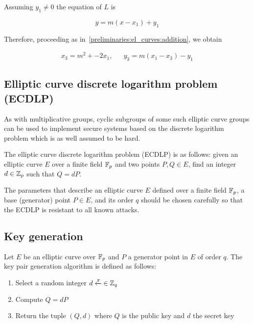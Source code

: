 Assuming $y_1 \neq 0$ the equation of $L$ is

\begin{equation*}
  y = m(x - x_1) + y_1
\end{equation*}

Therefore, proceeding as in~\ref{preliminaries:el_curves:addition}, we obtain

\begin{align*}
  x_3 = m^{2} + - 2x_1, && y_3 = m(x_1 - x_3) - y_1
\end{align*}

\subsection{Elliptic curve discrete logarithm problem (ECDLP)}

As with multiplicative groups, cyclic subgroups of some such elliptic curve groups can be used to implement secure systems based on the discrete logarithm problem which is as well assumed to be hard.

\begin{dfn}
  The elliptic curve discrete logarithm problem (ECDLP) is as follows: given an elliptic curve $E$ over a finite field $\mathbb{F}_p$ and two points $P, Q \in E$, find an integer $d \in \mathbb{Z}_p$ such that $Q = dP$.
\end{dfn}

The parameters that describe an elliptic curve $E$ defined over a finite field $\mathbb{F}_p$, a base (generator) point $P \in E$, and its order $q$ should be chosen carefully so that the ECDLP is resistant to all known attacks.

\subsection[Key generation]{Key generation~\cite{elliptic_curves_2}}
\label{preliminaries:el_curves:key_gen}

Let $E$ be an elliptic curve over $\mathbb{F}_p$ and $P$ a generator point in $E$ of order $q$. The key pair generation algorithm is defined as follows:

\begin{enumerate}
  \item Select a random integer $d \xleftarrow{\mathtt{r}}{\in \mathbb{Z}_q}$
  \item Compute $Q = dP$
  \item Return the tuple $(Q, d)$ where $Q$ is the public key and $d$ the secret key
\end{enumerate}

